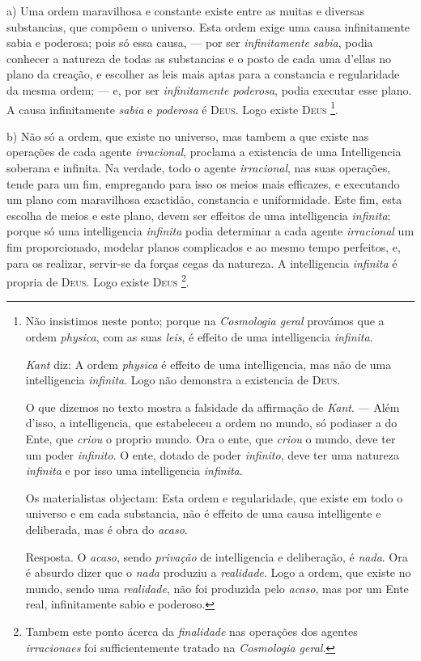 a) Uma ordem maravilhosa e constante existe entre as muitas e diversas substancias, que compõem o universo. Esta ordem exige uma causa infinitamente sabia e poderosa; pois só essa causa, --- por ser \emph{infinitamente sabia}, podia conhecer a natureza de todas as substancias e o posto de cada uma d'ellas no plano da creação, e escolher as leis mais aptas para a constancia e regularidade da mesma ordem; --- e, por ser \emph{infinitamente poderosa}, podia executar esse plano. A causa infinitamente \emph{sabia} e \emph{poderosa} é \textsc{Deus}. Logo existe \textsc{Deus} \footnote{Não insistimos neste ponto; porque na \emph{Cosmologia geral} provámos que a ordem \emph{physica}, com as suas \emph{leis}, é effeito de uma intelligencia \emph{infinita}.\par \emph{Kant} diz: A ordem \emph{physica} é effeito de uma intelligencia, mas não de uma intelligencia \emph{infinita}. Logo não demonstra a existencia de \textsc{Deus}.\par O que dizemos no texto mostra a falsidade da affirmação de \emph{Kant}. --- Além d'isso, a intelligencia, que estabeleceu a ordem no mundo, só podiaser a do Ente, que \emph{criou} o proprio mundo. Ora o ente, que \emph{criou} o mundo, deve ter um poder \emph{infinito}. O ente, dotado de poder \emph{infinito}, deve ter uma natureza \emph{infinita} e por isso uma intelligencia \emph{infinita}.\par Os materialistas objectam: Esta ordem e regularidade, que existe em todo o universo e em cada substancia, não é effeito de uma causa intelligente e deliberada, mas é obra do \emph{acaso}.\par Resposta. O \emph{acaso}, sendo \emph{privação} de intelligencia e deliberação, é \emph{nada}. Ora é absurdo dizer que o \emph{nada} produziu a \emph{realidade}. Logo a ordem, que existe no mundo, sendo uma \emph{realidade}, não foi produzida pelo \emph{acaso}, mas por um Ente real, infinitamente sabio e poderoso.}.

b) Não só a ordem, que existe no universo, mas tambem a que existe nas operações de cada agente \emph{irracional}, proclama a existencia de uma Intelligencia soberana e infinita. Na verdade, todo o agente \emph{irracional}, nas suas operações, tende para um fim, empregando para isso os meios mais efficazes, e executando um plano com maravilhosa exactidão, constancia e uniformidade. Este fim, esta escolha de meios e este plano, devem ser effeitos de uma intelligencia \emph{infinita}; porque só uma intelligencia \emph{infinita} podia determinar a cada agente \emph{irracional} um fim proporcionado, modelar planos complicados e ao mesmo tempo perfeitos, e, para os realizar, servir-se da forças cegas da natureza. A intelligencia \emph{infinita} é propria de \textsc{Deus}. Logo existe \textsc{Deus} \footnote{Tambem este ponto ácerca da \emph{finalidade} nas operações dos agentes \emph{irracionaes} foi sufficientemente tratado na \emph{Cosmologia geral}.}.

